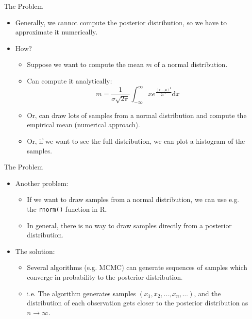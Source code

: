 \documentclass{beamer}
\begin{document}
\begin{frame}{The Problem}
    \begin{itemize}
    \item Generally, we cannot compute the posterior distribution, so we have to approximate
          it numerically.
    \item How?
        \begin{itemize}
            \item Suppose we want to compute the mean $m$ of a normal distribution.
            \item Can compute it analytically:
                \[  m = \frac{1}{\sigma \sqrt{2\pi}} 
                    \int_{-\infty}^\infty xe^{\frac{(x - \mu)^2}{2\sigma^2}} \mathrm{d}x\]
            \item Or, can draw lots of samples from a normal distribution and compute the
                  empirical mean (numerical approach).
            \item Or, if we want to see the full distribution, we can plot a histogram of the 
                  samples.
        \end{itemize}
    \end{itemize}
\end{frame}

\begin{frame}[fragile]{The Problem}
    \begin{itemize}
        \item Another problem:
            \begin{itemize}
                \item If we want to draw samples from a normal distribution, we can use e.g.     
                      the \verb+rnorm()+ function in R.
                \item In general, there is no way to draw samples directly from a posterior
                      distribution.
            \end{itemize}
        \item The solution:
            \begin{itemize}
                \item Several algorithms (e.g. MCMC) can generate sequences of 
                      samples which converge in probability to the posterior distribution.
                \item i.e. The algorithm generates samples $(x_1,x_2,\dots,x_n,\dots)$, and 
                           the distribution of each observation gets closer to the posterior 
                           distribution as $n \rightarrow \infty$.
            \end{itemize}             
    \end{itemize}
\end{frame}
\end{document}
